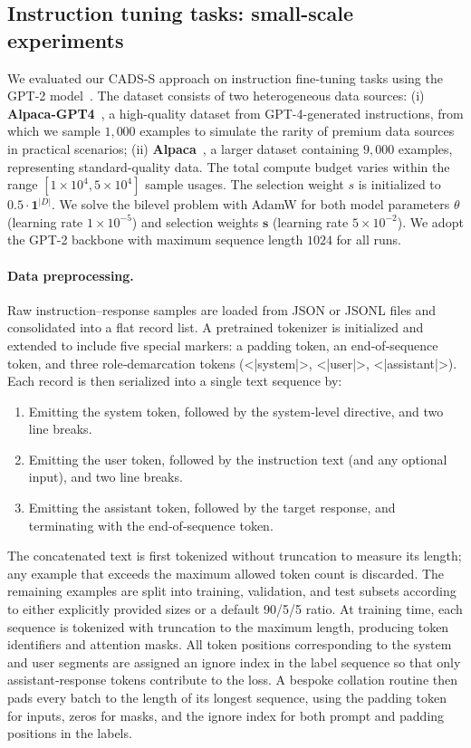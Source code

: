 \subsection{Instruction tuning tasks: small-scale experiments}
\label{appendix:instruction-tuning-small}

We evaluated our CADS‐S approach on instruction fine‐tuning tasks using the GPT-2 model~\cite{Radford2019LanguageMA}. The dataset consists of two heterogeneous data sources: (i) \textbf{Alpaca-GPT4}~\cite{alpaca-gpt4}, a high-quality dataset from GPT-4-generated instructions, from which we sample \(1{,}000\) examples to simulate the rarity of premium data sources in practical scenarios; (ii) \textbf{Alpaca}~\cite{alpaca}, a larger dataset containing \(9{,}000\) examples, representing standard-quality data. The total compute budget varies within the range \([1\times10^{4},5\times10^{4}]\) sample usages. 
The selection weight \(s\) is initialized to \(0.5\cdot \bm{1}^{|D|}\). We solve the bilevel problem with AdamW for both model parameters \(\theta\) (learning rate \(1\times10^{-5}\)) and selection weights $\bm{s}$ (learning rate \(5\times10^{-2}\)). We adopt the GPT-2 backbone with maximum sequence length \(1024\) for all runs.

\paragraph{Data preprocessing.}  
Raw instruction–response samples are loaded from JSON or JSONL files and consolidated into a flat record list. A pretrained tokenizer is initialized and extended to include five special markers: a padding token, an end‐of‐sequence token, and three role‐demarcation tokens (<|system|>, <|user|>, <|assistant|>). Each record is then serialized into a single text sequence by:
\begin{enumerate}
  \item Emitting the system token, followed by the system‐level directive, and two line breaks.
  \item Emitting the user token, followed by the instruction text (and any optional input), and two line breaks.
  \item Emitting the assistant token, followed by the target response, and terminating with the end‐of‐sequence token.
\end{enumerate}
The concatenated text is first tokenized without truncation to measure its length; any example that exceeds the maximum allowed token count is discarded. The remaining examples are split into training, validation, and test subsets according to either explicitly provided sizes or a default 90/5/5 ratio.
At training time, each sequence is tokenized with truncation to the maximum length, producing token identifiers and attention masks. All token positions corresponding to the system and user segments are assigned an ignore index in the label sequence so that only assistant‐response tokens contribute to the loss. A bespoke collation routine then pads every batch to the length of its longest sequence, using the padding token for inputs, zeros for masks, and the ignore index for both prompt and padding positions in the labels. 

